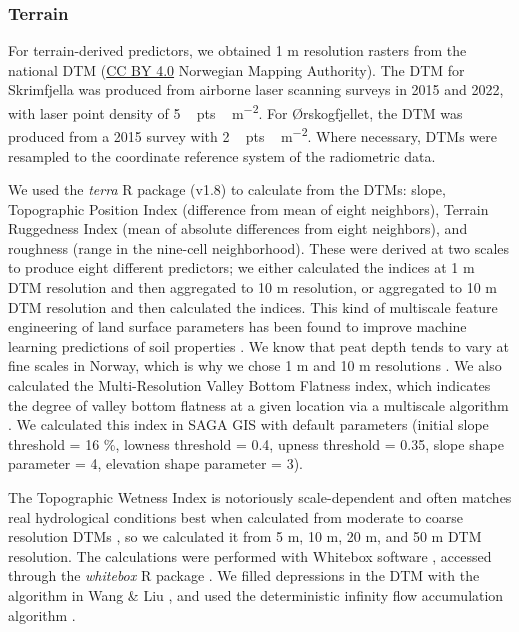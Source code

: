 \documentclass[soil, manuscript]{copernicus}
\begin{document}
\subsubsection{Terrain}

For terrain-derived predictors, we obtained 1 m resolution rasters from the national DTM (\href{https://creativecommons.org/licenses/by/4.0/}{CC BY 4.0} Norwegian Mapping Authority).
The DTM for Skrimfjella was produced from airborne laser scanning surveys in 2015 and 2022, with laser point density of \unit{5\,pts\,m^{-2}}.
For Ørskogfjellet, the DTM was produced from a 2015 survey with \unit{2\,pts\,m^{-2}}.
Where necessary, DTMs were resampled to the coordinate reference system of the radiometric data.

We used the \emph{terra} R package (v1.8) to calculate from the DTMs: slope, Topographic Position Index (difference from mean of eight neighbors), Terrain Ruggedness Index (mean of absolute differences from eight neighbors), and roughness (range in the nine-cell neighborhood).
These were derived at two scales to produce eight different predictors; we either calculated the indices at 1 m DTM resolution and then aggregated to 10 m resolution, or aggregated to 10 m DTM resolution and then calculated the indices.
This kind of multiscale feature engineering of land surface parameters has been found to improve machine learning predictions of soil properties \citep{millerImpactMultiscalePredictor2015, dornikOptimalScalingPredictors2022, newmanAssessingSpatiallyHeterogeneous2023}.
We know that peat depth tends to vary at fine scales in Norway, which is why we chose 1 m and 10 m resolutions \citep{maxwellLandsurfaceParametersSpatial2022}.
We also calculated the Multi-Resolution Valley Bottom Flatness index, which indicates the degree of valley bottom flatness at a given location via a multiscale algorithm \citep{gallantMultiresolutionIndexValley2003}.
We calculated this index in SAGA GIS \citep[v.9.3.2, Morphometry library,][]{conradSystemAutomatedGeoscientific2015} with default parameters (initial slope threshold = 16 \%, lowness threshold = 0.4, upness threshold = 0.35, slope shape parameter = 4, elevation shape parameter = 3).

The Topographic Wetness Index \citep{quinnPredictionHillslopeFlow1991} is notoriously scale-dependent and often matches real hydrological conditions best when calculated from moderate to coarse resolution DTMs \citep{agrenEvaluatingDigitalTerrain2014, riihimakiTopographicWetnessIndex2021}, so we calculated it from 5 m, 10 m, 20 m, and 50 m DTM resolution.
The calculations were performed with Whitebox software \citep{lindsayWhiteboxGATCase2016}, accessed through the \emph{whitebox} R package \citep[v2.4,][]{wuWhiteboxWhiteboxToolsFrontend2022}.
We filled depressions in the DTM with the algorithm in Wang \& Liu \citeyearpar{wangEfficientMethodIdentifying2006}, and used the deterministic infinity flow accumulation algorithm \citep{tarbotonNewMethodDetermination1997}.
\end{document}
